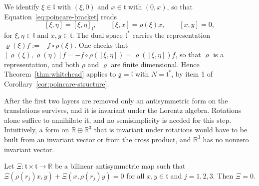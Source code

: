 \begin{remark}\label{rem:lorentz-semisimple}
	We identify $\xi\in\mathfrak{l}$ with $(\xi,0)$ and $x\in\mathfrak{t}$ with $(0,x)$, so that Equation~\eqref{eq:poincare-bracket} reads
	\begin{equation}\label{eq:semidirect-brackets}
		[\xi,\eta]=[\xi,\eta]_{\mathfrak{l}},\qquad [\xi,x]=\rho(\xi)x,\qquad [x,y]=0,
	\end{equation}
	for $\xi,\eta\in\mathfrak{l}$ and $x,y\in\mathfrak{t}$. The dual space $\mathfrak{t}^*$ carries the representation $\varrho(\xi)f:=-f\circ\rho(\xi)$. One checks that $[\varrho(\xi),\varrho(\eta)]f=-f\circ\rho([\xi,\eta])=\varrho([\xi,\eta])f$, so that $\varrho$ is a representation, and both $\rho$ and $\varrho$ are finite dimensional. Hence Theorem~\ref{thm:whitehead} applies to $\mathfrak{g}=\mathfrak{l}$ with $N=\mathfrak{t}^*$, by item 1 of Corollary~\ref{cor:poincare-structure}.
\end{remark}

After the first two layers are removed only an antisymmetric form on the translations survives, and it is invariant under the Lorentz algebra. Rotations alone suffice to annihilate it, and no semisimplicity is needed for this step. Intuitively, a form on $\mathbb{R}\oplus\mathbb{R}^3$ that is invariant under rotations would have to be built from an invariant vector or from the cross product, and $\mathbb{R}^3$ has no nonzero invariant vector.

\begin{lemma}\label{lem:rotation-invariant}
	Let $\Xi:\mathfrak{t}\times\mathfrak{t}\to\mathbb{R}$ be a bilinear antisymmetric map such that $\Xi(\rho(r_j)x,y)+\Xi(x,\rho(r_j)y)=0$ for all $x,y\in\mathfrak{t}$ and $j=1,2,3$. Then $\Xi=0$.
\end{lemma}

